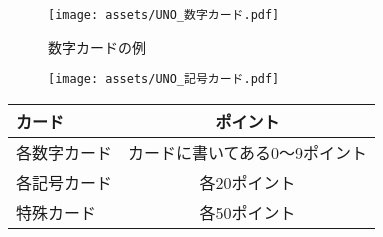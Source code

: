 \documentclass[11pt]{ltjsarticle}
\begin{document}
\begin{figure}[h]
  \begin{center}
    \texttt{[image: assets/UNO\_数字カード.pdf]}
    \caption{数字カードの例}
    \label{fig:数字カードの例}
  \end{center}
\end{figure}


\begin{figure}[h]
  \begin{center}
    \texttt{[image: assets/UNO\_記号カード.pdf]}

    \label{fig:ドローツーカードの例}
  \end{center}
\end{figure}

\begin{table}[h]
  \begin{center}
    \begin{tabular}{|l|c|} \hline
      カード & ポイント \\ \hline \hline
      各数字カード & カードに書いてある0～9ポイント \\
      各記号カード & 各20ポイント \\
      特殊カード & 各50ポイント \\ \hline
    \end{tabular}
    \label{tab:カードポイント}
  \end{center}
\end{table}
\end{document}
